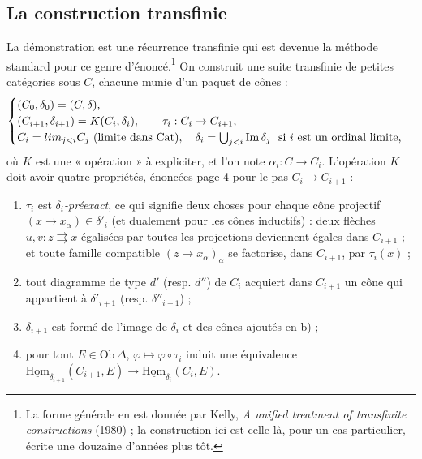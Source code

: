 \documentclass[11pt,a4paper]{article}
\begin{document}
\subsection*{La construction transfinie}

La démonstration est une récurrence transfinie qui est devenue la méthode
standard pour ce genre d'énoncé.\footnote{La forme générale en est donnée
par Kelly, \emph{A unified treatment of transfinite constructions} (1980) ;
la construction ici est celle-là, pour un cas particulier, écrite une
douzaine d'années plus tôt.} On construit une suite transfinie de petites
catégories sous $C$, chacune munie d'un paquet de cônes :
\[
\begin{cases}
(C_{0}, \delta_{0}) = (C, \delta), \\
(C_{i+1}, \delta_{i+1}) = K(C_{i}, \delta_{i}), \qquad
\tau_{i} : C_{i} \to C_{i+1}, \\
C_{i} = \varinjlim_{j < i} C_{j} \ \text{(limite dans } \mathrm{Cat}),
\quad \delta_{i} = \bigcup_{j<i} \mathrm{Im}\,\delta_{j}
\ \text{ si $i$ est un ordinal limite,}
\end{cases}
\]
où $K$ est une « opération » à expliciter, et l'on note $\alpha_{i} : C \to
C_{i}$. L'opération $K$ doit avoir quatre propriétés, énoncées page 4 pour
le pas $C_{i} \to C_{i+1}$ :

\begin{enumerate}
\item[a)] $\tau_{i}$ est \emph{$\delta_{i}$-préexact}, ce qui signifie deux
choses pour chaque cône projectif $(x \to x_{\alpha}) \in \delta'_{i}$ (et
dualement pour les cônes inductifs) : deux flèches $u, v : z \rightrightarrows
x$ égalisées par toutes les projections deviennent égales dans $C_{i+1}$ ;
et toute famille compatible $(z \to x_{\alpha})_{\alpha}$ se factorise, dans
$C_{i+1}$, par $\tau_{i}(x)$ ;
\item[b)] tout diagramme de type $d'$ (resp. $d''$) de $C_{i}$ acquiert dans
$C_{i+1}$ un cône qui appartient à $\delta'_{i+1}$ (resp. $\delta''_{i+1}$) ;
\item[c)] $\delta_{i+1}$ est formé de l'image de $\delta_{i}$ et des cônes
ajoutés en b) ;
\item[d)] pour tout $E \in \mathrm{Ob}\,\Delta$, $\varphi \mapsto \varphi
\circ \tau_{i}$ induit une équivalence
$\underline{\mathrm{Hom}}_{\delta_{i+1}}(C_{i+1}, E) \to
\underline{\mathrm{Hom}}_{\delta_{i}}(C_{i}, E)$.
\end{enumerate}
\end{document}
